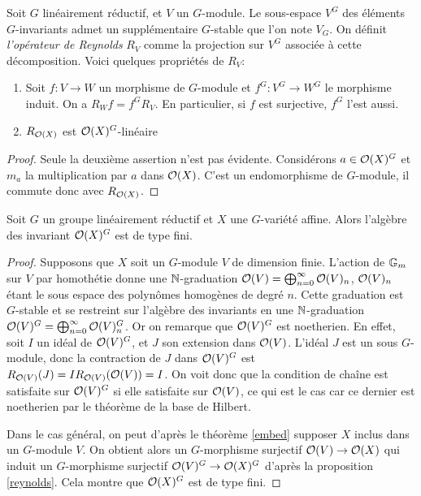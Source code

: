 Soit $G$ linéairement réductif, et $V$ un $G$-module. Le sous-espace $V^G$ des éléments $G$-invariants admet un supplémentaire $G$-stable que l'on note $V_G$. On définit \textit{l'opérateur de Reynolds} $R_V$ comme la projection sur $V^G$ associée à cette décomposition. Voici quelques propriétés de $R_V$:


\begin{prop}\label{reynolds}
\begin{enumerate}
\item Soit $f:V \rightarrow W$ un morphisme de $G$-module et $f^G:V^G \rightarrow W^G$ le morphisme induit. On a $R_Wf=f^GR_V$. En particulier, si $f$ est surjective, $f^G$ l'est aussi.
\item $R_{\mathcal{O}(X)}$ est $\mathcal{O}(X)^G$-linéaire
\end{enumerate}
\end{prop}
\begin{proof}
Seule la deuxième assertion n'est pas évidente. Considérons $a\in \mathcal{O}(X)^G$ et $m_a$ la multiplication par $a$ dans $\mathcal{O}(X)$. C'est un endomorphisme de $G$-module, il commute donc avec $R_{\mathcal{O}(X)}$. 
\end{proof}

\begin{thm}[Hilbert]\label{hilbert}
Soit $G$ un groupe linéairement réductif et $X$ une $G$-variété affine. Alors l'algèbre des invariant $\mathcal{O}(X)^G$ est de type fini.
\end{thm}
\begin{proof}
Supposons que $X$ soit un $G$-module $V$ de dimension finie. L'action de $\mathbb{G}_m$ sur $V$ par homothétie donne une $\mathbb{N}$-graduation $\mathcal{O}(V)=\bigoplus_{n=0}^{\infty}\mathcal{O}(V)_n$, $\mathcal{O}(V)_n$ étant le sous espace des polynômes homogènes de degré $n$. Cette graduation est $G$-stable et se restreint sur l'algèbre des invariants en une $\mathbb{N}$-graduation $\mathcal{O}(V)^G=\bigoplus_{n=0}^{\infty}\mathcal{O}(V)^G_n$. Or on remarque que $\mathcal{O}(V)^G$ est noetherien. En effet, soit $I$ un idéal de $\mathcal{O}(V)^G$, et $J$ son extension dans $\mathcal{O}(V)$. L'idéal $J$ est un sous $G$-module, donc la contraction de $J$ dans $\mathcal{O}(V)^G$ est $R_{\mathcal{O}(V)}(J)=IR_{\mathcal{O}(V)}(\mathcal{O}(V))=I$. On voit donc que la condition de chaîne est satisfaite sur $\mathcal{O}(V)^G$ si elle satisfaite sur $\mathcal{O}(V)$, ce qui est le cas car ce dernier est noetherien par le théorème de la base de Hilbert. 

Dans le cas général, on peut d'après le théorème \ref{embed} supposer $X$ inclus dans un $G$-module $V$. On obtient alors un $G$-morphisme surjectif $\mathcal{O}(V) \rightarrow \mathcal{O}(X)$ qui induit un $G$-morphisme surjectif $\mathcal{O}(V)^G \rightarrow \mathcal{O}(X)^G$ d'après la proposition \ref{reynolds}. Cela montre que $\mathcal{O}(X)^G$ est de type fini.
\end{proof}

